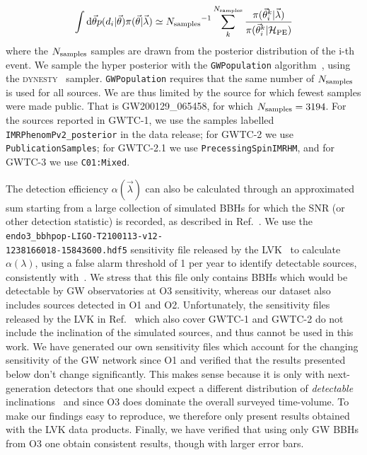\documentclass[floats,floatfix,showpacs,amssymb,prl,twocolumn,superscriptaddress,nofootinbib]{revtex4-2}
\newcommand{\beq}{\begin{equation}}
\newcommand{\eeq}{\end{equation}}
\newcommand{\nn}{\nonumber}
\newcommand{\vl}{\ensuremath{\vec{\lambda}}\xspace}
\newcommand{\vt}{\ensuremath{\vec{\theta}}\xspace}
\newcommand{\ud}{\ensuremath{\mathrm{d}}}
\newcommand{\maHP}{\ensuremath{\mathcal{H}_{\mathrm{PE}}}\xspace}
\begin{document}
\beq
\int \ud \vt p(d_i |\vt ) \pi(\vt|\vl) \simeq {N_{\rm{samples}}}^{-1} \sum_{k}^{N_{\rm{samples}}}\frac{\pi(\vt^k_i|\vl) }{\pi(\vt^k_i|\maHP)} \nn
\eeq
where the ${N_{\rm{samples}}}$ samples are drawn from the posterior distribution of the i-th event. We sample the hyper posterior with the \texttt{GWPopulation} algorithm~\cite{2019PhRvD.100d3030T}, using the \textsc{dynesty}~\cite{Speagle_2020} sampler. \texttt{GWPopulation} requires that the same number of ${N_{\rm{samples}}}$ is used for all sources. We are thus limited by the source for which fewest samples were made public. That is GW200129\_065458, for which ${N_{\rm{samples}}}=3194$.
For the sources reported in GWTC-1, we use the samples labelled \texttt{IMRPhenomPv2\_posterior} in the data release; for GWTC-2 we use \texttt{PublicationSamples}; for GWTC-2.1 we use \texttt{PrecessingSpinIMRHM}, and for GWTC-3 we use \texttt{C01:Mixed}.

The detection efficiency $\alpha(\vl)$ can also be calculated through an approximated sum starting from a large collection of simulated BBHs for which the SNR (or other detection statistic) is recorded, as described in Ref.~\cite{2019RNAAS...3...66F,LIGOScientific:2021psn}. We use the \texttt{endo3\_bbhpop-LIGO-T2100113-v12-\\1238166018-15843600.hdf5}  sensitivity file released by the LVK~\cite{ligo_scientific_collaboration_and_virgo_2021_5546676} to calculate $\alpha(\lambda)$, using a false alarm threshold of 1 per year to identify detectable sources, consistently with~\cite{LIGOScientific:2021psn}. We stress that this file only contains BBHs which would be detectable by GW observatories at O3 sensitivity, whereas our dataset also includes sources detected in O1 and O2. Unfortunately, the sensitivity files released by the LVK in Ref.~\cite{ligo_scientific_collaboration_and_virgo_2021_5636816}  which also cover GWTC-1 and GWTC-2 do not include the inclination of the simulated sources, and thus cannot be used in this work. We have generated our own sensitivity files which account for the changing sensitivity of the GW network since O1 and verified that the results presented below don't change significantly. This makes sense because it is only with next-generation detectors that one should expect a different distribution of \emph{detectable} inclinations~\cite{Schutz:2011tw,Vitale:2016aso} and since O3 does dominate the overall surveyed time-volume. To make our findings easy to reproduce, we therefore only present results obtained with the LVK data products. Finally, we have verified that using only GW BBHs from O3 one obtain consistent results, though with larger error bars.
\end{document}
